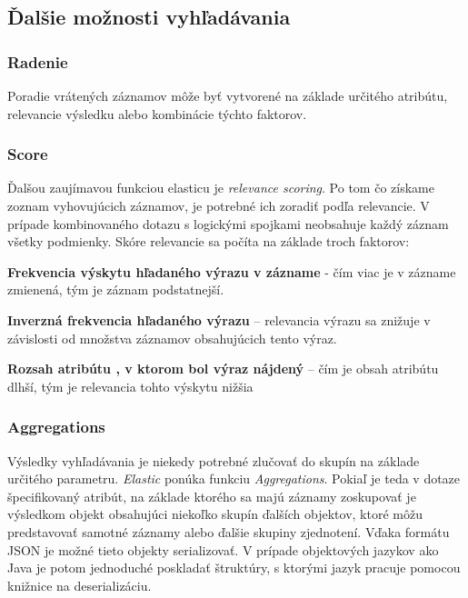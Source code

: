\documentclass[
  print, %
  table,   %
  lof,     %
  nolot,     %
]{fithesis3}
\begin{document}
\subsection{Ďalšie možnosti vyhľadávania}							
\subsubsection{Radenie}
Poradie vrátených záznamov môže byť vytvorené na základe určitého atribútu, relevancie výsledku alebo kombinácie týchto faktorov.
\subsubsection{Score}
Ďalšou zaujímavou funkciou elasticu je \textit{relevance scoring}. Po tom čo získame zoznam vyhovujúcich záznamov, je potrebné ich zoradiť podľa relevancie. V prípade kombinovaného dotazu s logickými spojkami neobsahuje každý záznam všetky podmienky. Skóre relevancie sa počíta na základe troch faktorov:
\begin{compactenum}
	\item \textbf{Frekvencia výskytu hľadaného výrazu v zázname} - čím viac je v zázname zmienená, tým je záznam podstatnejší.
	\item \textbf{Inverzná frekvencia hľadaného výrazu} – relevancia výrazu sa znižuje v závislosti od množstva záznamov obsahujúcich tento výraz.
	\item \textbf{Rozsah atribútu , v ktorom bol výraz nájdený} – čím je obsah atribútu dlhší, tým je relevancia tohto výskytu nižšia
\end{compactenum}
\subsubsection{Aggregations}			
Výsledky vyhľadávania je niekedy potrebné zlučovať do skupín na základe určitého parametru. \textit{Elastic} ponúka funkciu \textit{Aggregations}. Pokiaľ je teda v dotaze špecifikovaný atribút, na základe ktorého sa majú záznamy zoskupovať je výsledkom objekt obsahujúci niekoľko skupín ďalších objektov, ktoré môžu predstavovať samotné záznamy alebo ďalšie skupiny zjednotení. Vďaka formátu JSON je možné tieto objekty serializovať. V prípade objektových jazykov ako Java je potom jednoduché poskladať štruktúry, s ktorými jazyk pracuje pomocou knižnice na deserializáciu.  
\end{document}
